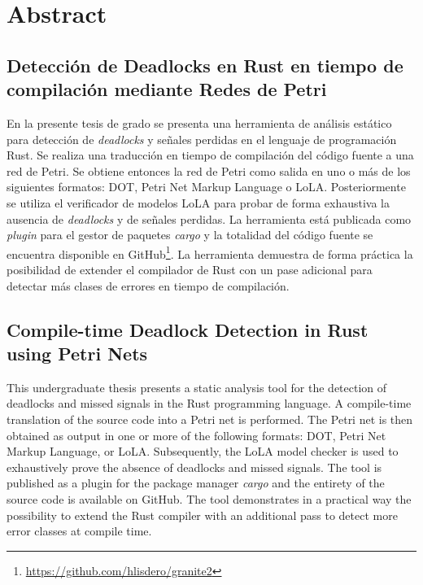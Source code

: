 \clearpage
{}
\chapter*{\centering Abstract}

\section*{Detección de Deadlocks en Rust en tiempo de compilación mediante Redes de Petri}

En la presente tesis de grado se presenta una herramienta de análisis estático
para detección de \textit{deadlocks} y señales perdidas en el lenguaje de programación Rust.
Se realiza una traducción en tiempo de compilación del código fuente a una red de Petri.
Se obtiene entonces la red de Petri como salida en uno o más de los siguientes formatos:
DOT, Petri Net Markup Language o \acrshort{LoLA}.
Posteriormente se utiliza el verificador de modelos \acrshort{LoLA}
para probar de forma exhaustiva la ausencia de \textit{deadlocks} y de señales perdidas.
La herramienta está publicada como \textit{plugin} para el gestor de paquetes \textit{cargo}
y la totalidad del código fuente se encuentra disponible
en GitHub\footnote[1]{\url{https://github.com/hlisdero/granite2}}.
La herramienta demuestra de forma práctica la posibilidad
de extender el compilador de Rust con un pase adicional para
detectar más clases de errores en tiempo de compilación.

\section*{Compile-time Deadlock Detection in Rust using Petri Nets}

This undergraduate thesis presents a static analysis tool
for the detection of deadlocks and missed signals in the Rust programming language.
A compile-time translation of the source code into a Petri net is performed.
The Petri net is then obtained as output in one or more of the following formats:
DOT, Petri Net Markup Language, or \acrshort{LoLA}.
Subsequently, the \acrshort{LoLA} model checker is used
to exhaustively prove the absence of deadlocks and missed signals.
The tool is published as a plugin for the package manager \textit{cargo} and
the entirety of the source code is available on GitHub\footnotemark[1].
The tool demonstrates in a practical way the possibility
to extend the Rust compiler with an additional pass
to detect more error classes at compile time.
